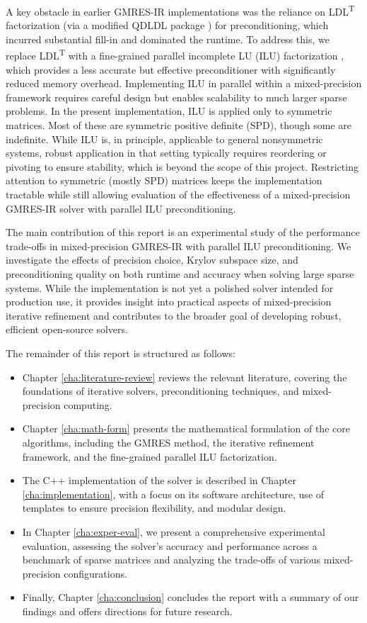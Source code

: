 A key obstacle in earlier GMRES-IR implementations was the reliance on
LDL\textsuperscript{T} factorization (via a modified QDLDL package
\cite{shahrooz_derakhshan_using_2023}) for preconditioning, which incurred
substantial fill-in and dominated the runtime. To address this, we replace
LDL\textsuperscript{T} with a fine-grained parallel incomplete LU (ILU)
factorization \cite{chow_fine-grained_2015}, which provides a less accurate but
effective preconditioner with significantly reduced memory overhead.
Implementing ILU in parallel within a mixed-precision framework requires careful
design but enables scalability to much larger sparse problems. In the present
implementation, ILU is applied only to symmetric matrices. Most of these are
symmetric positive definite (SPD), though some are indefinite. While ILU is, in
principle, applicable to general nonsymmetric systems, robust application in
that setting typically requires reordering or pivoting to ensure stability,
which is beyond the scope of this project. Restricting attention to symmetric
(mostly SPD) matrices keeps the implementation tractable while still allowing
evaluation of the effectiveness of a mixed-precision GMRES-IR solver with
parallel ILU preconditioning.

The main contribution of this report is an experimental study of the performance
trade-offs in mixed-precision GMRES-IR with parallel ILU preconditioning. We
investigate the effects of precision choice, Krylov subspace size, and
preconditioning quality on both runtime and accuracy when solving large sparse
systems. While the implementation is not yet a polished solver intended for
production use, it provides insight into practical aspects of mixed-precision
iterative refinement and contributes to the broader goal of developing robust,
efficient open-source solvers.

The remainder of this report is structured as follows:

\begin{itemize}
\item Chapter \ref{cha:literature-review} reviews the relevant literature, covering
  the foundations of iterative solvers, preconditioning techniques, and
  mixed-precision computing.
\item Chapter \ref{cha:math-form} presents the mathematical formulation of the core
  algorithms, including the GMRES method, the iterative refinement framework,
  and the fine-grained parallel ILU factorization.
\item The C++ implementation of the solver is described in Chapter
  \ref{cha:implementation}, with a focus on its software architecture, use of
  templates to ensure precision flexibility, and modular design.
\item In Chapter \ref{cha:exper-eval}, we present a comprehensive experimental
  evaluation, assessing the solver’s accuracy and performance across a benchmark
  of sparse matrices and analyzing the trade-offs of various mixed-precision
  configurations.
\item Finally, Chapter \ref{cha:conclusion} concludes the report with a summary of our
  findings and offers directions for future research.
\end{itemize}
